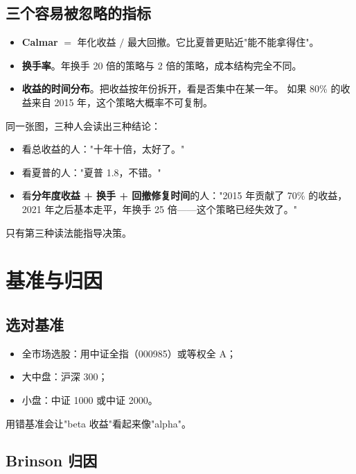 \subsection{三个容易被忽略的指标}

\begin{itemize}
  \item \textbf{Calmar} $=$ 年化收益 $/$ 最大回撤。它比夏普更贴近"能不能拿得住"。
  \item \textbf{换手率}。年换手 20 倍的策略与 2 倍的策略，成本结构完全不同。
  \item \textbf{收益的时间分布}。把收益按年份拆开，看是否集中在某一年。
        如果 80\% 的收益来自 2015 年，这个策略大概率不可复制。
\end{itemize}

\begin{warnbox}[一条净值曲线的三种读法]
同一张图，三种人会读出三种结论：
\begin{itemize}
  \item 看总收益的人："十年十倍，太好了。"
  \item 看夏普的人："夏普 1.8，不错。"
  \item 看\textbf{分年度收益 + 换手 + 回撤修复时间}的人："2015 年贡献了 70\% 的收益，
        2021 年之后基本走平，年换手 25 倍——这个策略已经失效了。"
\end{itemize}
只有第三种读法能指导决策。
\end{warnbox}

\section{基准与归因}

\subsection{选对基准}

\begin{itemize}
  \item 全市场选股：用中证全指（000985）或等权全 A；
  \item 大中盘：沪深 300；
  \item 小盘：中证 1000 或中证 2000。
\end{itemize}

用错基准会让"beta 收益"看起来像"alpha"。

\subsection{Brinson 归因}

